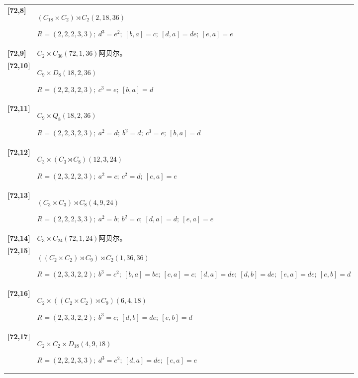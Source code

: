 \documentclass[UTF8,fontset=fandol,11pt,a4paper]{ctexart}
\begin{document}
\begin{longtable}{@{}p{17mm}>{\raggedright\arraybackslash}p{141mm}@{}}
\textbf{[72,8]} & $(C_{18}\times C_{2})\rtimes C_{2}$\quad $(2,18,36)$\par\(R=(2,2,2,3,3);\allowbreak\ d^{3}=e^{2};\allowbreak\ [b,a]=c;\allowbreak\ [d,a]=de;\allowbreak\ [e,a]=e\)\\[3pt]

\textbf{[72,9]} & $C_{2}\times C_{36}$\quad $(72,1,36)$\quad 阿贝尔。\\[3pt]

\textbf{[72,10]} & $C_{9}\times D_{8}$\quad $(18,2,36)$\par\(R=(2,2,3,2,3);\allowbreak\ c^{3}=e;\allowbreak\ [b,a]=d\)\\[3pt]

\textbf{[72,11]} & $C_{9}\times Q_{8}$\quad $(18,2,36)$\par\(R=(2,2,3,2,3);\allowbreak\ a^{2}=d;\allowbreak\ b^{2}=d;\allowbreak\ c^{3}=e;\allowbreak\ [b,a]=d\)\\[3pt]

\textbf{[72,12]} & $C_{3}\times (C_{3}\rtimes C_{8})$\quad $(12,3,24)$\par\(R=(2,3,2,2,3);\allowbreak\ a^{2}=c;\allowbreak\ c^{2}=d;\allowbreak\ [e,a]=e\)\\[3pt]

\textbf{[72,13]} & $(C_{3}\times C_{3})\rtimes C_{8}$\quad $(4,9,24)$\par\(R=(2,2,2,3,3);\allowbreak\ a^{2}=b;\allowbreak\ b^{2}=c;\allowbreak\ [d,a]=d;\allowbreak\ [e,a]=e\)\\[3pt]

\textbf{[72,14]} & $C_{3}\times C_{24}$\quad $(72,1,24)$\quad 阿贝尔。\\[3pt]

\textbf{[72,15]} & $((C_{2}\times C_{2})\rtimes C_{9})\rtimes C_{2}$\quad $(1,36,36)$\par\(R=(2,3,3,2,2);\allowbreak\ b^{3}=c^{2};\allowbreak\ [b,a]=bc;\allowbreak\ [c,a]=c;\allowbreak\ [d,a]=de;\allowbreak\ [d,b]=de;\allowbreak\ [e,a]=de;\allowbreak\ [e,b]=d\)\\[3pt]

\textbf{[72,16]} & $C_{2}\times ((C_{2}\times C_{2})\rtimes C_{9})$\quad $(6,4,18)$\par\(R=(2,3,3,2,2);\allowbreak\ b^{3}=c;\allowbreak\ [d,b]=de;\allowbreak\ [e,b]=d\)\\[3pt]

\textbf{[72,17]} & $C_{2}\times C_{2}\times D_{18}$\quad $(4,9,18)$\par\(R=(2,2,2,3,3);\allowbreak\ d^{3}=e^{2};\allowbreak\ [d,a]=de;\allowbreak\ [e,a]=e\)\\[3pt]


\end{longtable}
\end{document}

